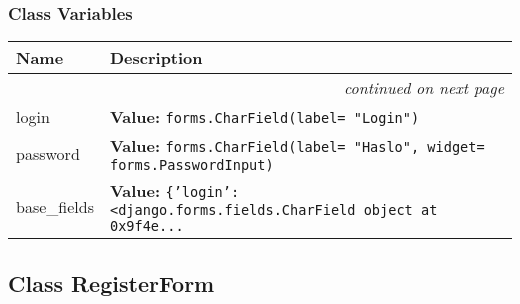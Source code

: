
  \subsubsection{Class Variables}

    \vspace{-1cm}
\hspace{\varindent}\begin{longtable}{|p{\varnamewidth}|p{\vardescrwidth}|l}
\cline{1-2}
\cline{1-2} \centering \textbf{Name} & \centering \textbf{Description}& \\
\cline{1-2}
\endhead\cline{1-2}\multicolumn{3}{r}{\small\textit{continued on next page}}\\\endfoot\cline{1-2}
\endlastfoot\raggedright l\-o\-g\-i\-n\- & \raggedright \textbf{Value:} 
{\tt forms.CharField(label= "Login")}&\\
\cline{1-2}
\raggedright p\-a\-s\-s\-w\-o\-r\-d\- & \raggedright \textbf{Value:} 
{\tt forms.CharField(label= "Haslo", widget= forms.PasswordInput)}&\\
\cline{1-2}
\raggedright b\-a\-s\-e\-\_\-f\-i\-e\-l\-d\-s\- & \raggedright \textbf{Value:} 
{\tt \{'login': {\textless}django.forms.fields.CharField object at 0x9f4e\texttt{...}}&\\
\cline{1-2}
\end{longtable}



\subsection{Class RegisterForm}

